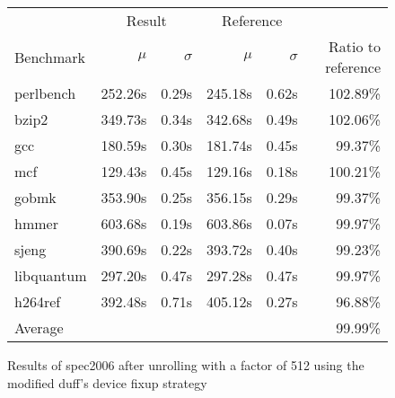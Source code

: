 \begin{figure}[h]
    \begin{center}
        \begin{tabular}{lrrrrr}
            \toprule
            & \multicolumn{2}{c}{Result} & \multicolumn{2}{c}{Reference}\\
            Benchmark & $\mu$ & $\sigma$ & $\mu$ & $\sigma$ & Ratio to reference\\
            \midrule
            perlbench & 252.26s & 0.29s & 245.18s & 0.62s & 102.89\%\\
            bzip2 & 349.73s & 0.34s & 342.68s & 0.49s & 102.06\%\\
            gcc & 180.59s & 0.30s & 181.74s & 0.45s & 99.37\%\\
            mcf & 129.43s & 0.45s & 129.16s & 0.18s & 100.21\%\\
            gobmk & 353.90s & 0.25s & 356.15s & 0.29s & 99.37\%\\
            hmmer & 603.68s & 0.19s & 603.86s & 0.07s & 99.97\%\\
            sjeng & 390.69s & 0.22s & 393.72s & 0.40s & 99.23\%\\
            libquantum & 297.20s & 0.47s & 297.28s & 0.47s & 99.97\%\\
            h264ref & 392.48s & 0.71s & 405.12s & 0.27s & 96.88\%\\
            \midrule
            Average & & & & & 99.99\%\\
            \bottomrule
        \end{tabular}
    \end{center}
    \caption{Results of spec2006 after unrolling with a factor of 512 using the modified duff's device fixup strategy}
    \label{fig:eval:perf:duff:512}
\end{figure}
